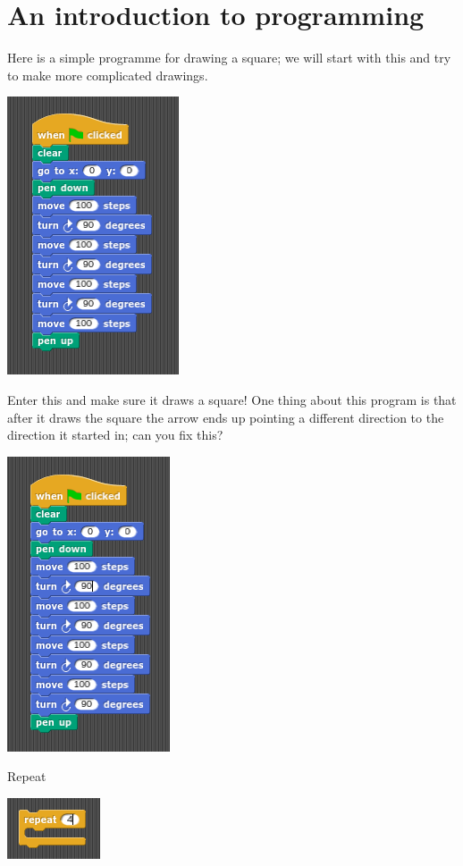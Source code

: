 \documentclass[11pt,a4paper]{scrartcl}
\begin{document}
\section*{An introduction to programming}

Here is a simple programme for drawing a square; we will start with
this and try to make more complicated drawings.
\begin{center}
\includegraphics{basic_square.png}
\end{center}
Enter this and make sure it draws a square! One thing about this
program is that after it draws the square the arrow ends up pointing a
different direction to the direction it started in; can you fix this?
\begin{center}
\includegraphics{basic_square_point.png}
\end{center}
Repeat
\begin{center}
\includegraphics{repeat.png}
\end{center}
\end{document}
